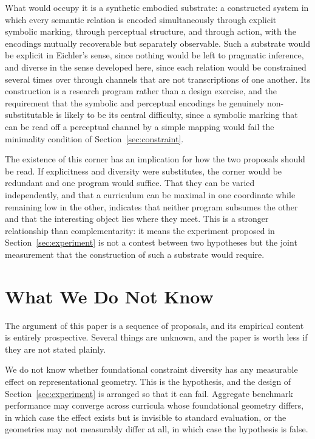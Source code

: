 \documentclass[11pt]{article}
\begin{document}
What would occupy it is a synthetic embodied substrate: a constructed system in which every semantic relation is encoded simultaneously through explicit symbolic marking, through perceptual structure, and through action, with the encodings mutually recoverable but separately observable. Such a substrate would be explicit in Eichler's sense, since nothing would be left to pragmatic inference, and diverse in the sense developed here, since each relation would be constrained several times over through channels that are not transcriptions of one another. Its construction is a research program rather than a design exercise, and the requirement that the symbolic and perceptual encodings be genuinely non-substitutable is likely to be its central difficulty, since a symbolic marking that can be read off a perceptual channel by a simple mapping would fail the minimality condition of Section~\ref{sec:constraint}.

The existence of this corner has an implication for how the two proposals should be read. If explicitness and diversity were substitutes, the corner would be redundant and one program would suffice. That they can be varied independently, and that a curriculum can be maximal in one coordinate while remaining low in the other, indicates that neither program subsumes the other and that the interesting object lies where they meet. This is a stronger relationship than complementarity: it means the experiment proposed in Section~\ref{sec:experiment} is not a contest between two hypotheses but the joint measurement that the construction of such a substrate would require.

\section{What We Do Not Know}
\label{sec:unknown}

The argument of this paper is a sequence of proposals, and its empirical content is entirely prospective. Several things are unknown, and the paper is worth less if they are not stated plainly.

We do not know whether foundational constraint diversity has any measurable effect on representational geometry. This is the hypothesis, and the design of Section~\ref{sec:experiment} is arranged so that it can fail. Aggregate benchmark performance may converge across curricula whose foundational geometry differs, in which case the effect exists but is invisible to standard evaluation, or the geometries may not measurably differ at all, in which case the hypothesis is false.
\end{document}
